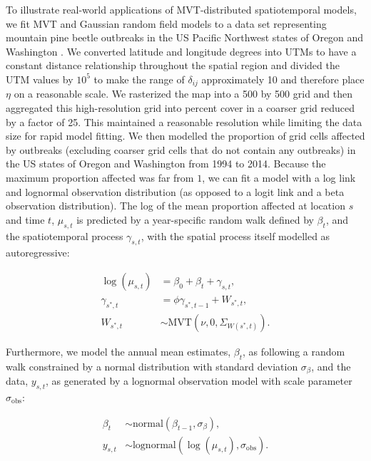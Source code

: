 \documentclass[12pt,english]{article}
\begin{document}
\begin{spacing}{1.9}
To illustrate real-world applications of MVT-distributed
spatiotemporal models,
we fit MVT and Gaussian random field models
to a data set representing
mountain pine beetle outbreaks in the
US Pacific Northwest states of Oregon and Washington \citep{usdaforestservice2017}.
We converted latitude and longitude degrees into UTMs to have a constant
distance relationship throughout the spatial region and divided the UTM values
by $10^5$ to make the range of $\delta_{ij}$ approximately 10 and therefore
place $\eta$ on a reasonable scale.
We rasterized the map into a 500 by 500 grid
and then aggregated this high-resolution grid
into percent cover in a coarser grid reduced by a factor of 25.
This maintained a reasonable resolution
while limiting the data size for rapid model fitting.
We then modelled the
proportion of grid cells affected by outbreaks
(excluding coarser grid cells that do not contain any outbreaks)
in the US states of Oregon and Washington from 1994 to 2014.
Because the maximum proportion affected was far from $1$, we
can fit a model with a log link and lognormal observation distribution
(as opposed to a logit link and a beta observation distribution).
The log of the mean proportion affected at location $s$ and time $t$, $\mu_{s,t}$
is predicted by a year-specific random walk defined by $\beta_t$,
and the spatiotemporal process $\gamma_{s,t}$,
with the spatial process itself modelled as autoregressive:

\begin{align}
  \log(\mu_{s,t}) &= \beta_0 + \beta_t + \gamma_{s,t},\\
  \gamma_{s^{*},t} &= \phi \gamma_{s^{*},t-1} + W_{s^{*},t},\\ \label{eq:beetle-mu}
  W_{s^{*},t} &\sim \mathrm{MVT}\left(\nu, 0, \Sigma_{W(s^{*},t)}\right).
\end{align}

\noindent Furthermore, we model the annual
mean estimates, $\beta_t$, as following a random walk
constrained by a normal distribution with standard deviation $\sigma_{\beta}$,
and the data, $y_{s,t}$, as generated by a lognormal observation model
with scale parameter $\sigma_{\mathrm{obs}}$:

 \begin{align}
 \beta_t &\sim \mathrm{normal}\left( \beta_{t-1}, \sigma_{\beta} \right),\\
  y_{s,t} &\sim \mathrm{lognormal} \left(  \log(\mu_{s,t}), \sigma_{\mathrm{obs}} \right).
 \end{align}


\end{spacing}
\end{document}

